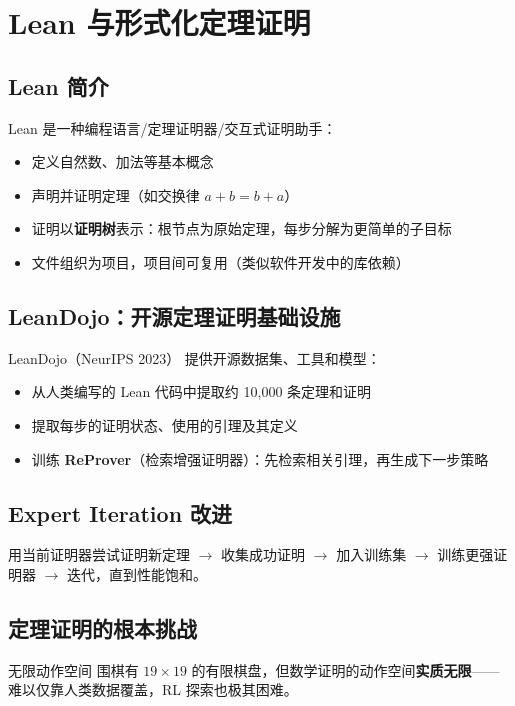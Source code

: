 \section{Lean 与形式化定理证明}

\subsection{Lean 简介}

Lean 是一种编程语言/定理证明器/交互式证明助手：
\begin{itemize}
    \item 定义自然数、加法等基本概念
    \item 声明并证明定理（如交换律 $a+b=b+a$）
    \item 证明以\textbf{证明树}表示：根节点为原始定理，每步分解为更简单的子目标
    \item 文件组织为项目，项目间可复用（类似软件开发中的库依赖）
\end{itemize}

\subsection{LeanDojo：开源定理证明基础设施}

\begin{importantbox}{LeanDojo（NeurIPS 2023）}
提供开源数据集、工具和模型：
\begin{itemize}
    \item 从人类编写的 Lean 代码中提取约 10,000 条定理和证明
    \item 提取每步的证明状态、使用的引理及其定义
    \item 训练 \textbf{ReProver}（检索增强证明器）：先检索相关引理，再生成下一步策略
\end{itemize}
\end{importantbox}

\subsection{Expert Iteration 改进}

用当前证明器尝试证明新定理 $\to$ 收集成功证明 $\to$ 加入训练集 $\to$ 训练更强证明器 $\to$ 迭代，直到性能饱和。

\subsection{定理证明的根本挑战}

\begin{warningbox}{无限动作空间}
围棋有 $19\times19$ 的有限棋盘，但数学证明的动作空间\textbf{实质无限}——难以仅靠人类数据覆盖，RL 探索也极其困难。
\end{warningbox}

